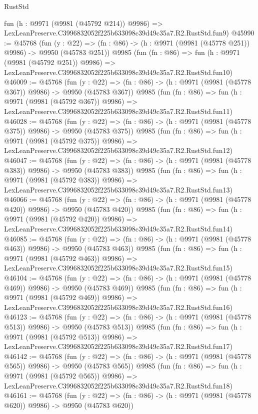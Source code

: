 \begin{lexlean}{RustStd}
\begin{coremodule}
    fun (h : @9971 (@9981 (@45792 @214)) @9986) =>
    LexLeanPreserve.C3996832052f225b633098c39d49c35a7.R2.RustStd.fun9)
@45990 := @45768
    (fun (y : @22) => (fn : @86) -> (h : @9971 (@9981 (@45778 @251)) @9986) -> @9950 (@45783 @251))
    @9985
    (fun (fn : @86) =>
    fun (h : @9971 (@9981 (@45792 @251)) @9986) =>
    LexLeanPreserve.C3996832052f225b633098c39d49c35a7.R2.RustStd.fun10)
@46009 := @45768
    (fun (y : @22) => (fn : @86) -> (h : @9971 (@9981 (@45778 @367)) @9986) -> @9950 (@45783 @367))
    @9985
    (fun (fn : @86) =>
    fun (h : @9971 (@9981 (@45792 @367)) @9986) =>
    LexLeanPreserve.C3996832052f225b633098c39d49c35a7.R2.RustStd.fun11)
@46028 := @45768
    (fun (y : @22) => (fn : @86) -> (h : @9971 (@9981 (@45778 @375)) @9986) -> @9950 (@45783 @375))
    @9985
    (fun (fn : @86) =>
    fun (h : @9971 (@9981 (@45792 @375)) @9986) =>
    LexLeanPreserve.C3996832052f225b633098c39d49c35a7.R2.RustStd.fun12)
@46047 := @45768
    (fun (y : @22) => (fn : @86) -> (h : @9971 (@9981 (@45778 @383)) @9986) -> @9950 (@45783 @383))
    @9985
    (fun (fn : @86) =>
    fun (h : @9971 (@9981 (@45792 @383)) @9986) =>
    LexLeanPreserve.C3996832052f225b633098c39d49c35a7.R2.RustStd.fun13)
@46066 := @45768
    (fun (y : @22) => (fn : @86) -> (h : @9971 (@9981 (@45778 @420)) @9986) -> @9950 (@45783 @420))
    @9985
    (fun (fn : @86) =>
    fun (h : @9971 (@9981 (@45792 @420)) @9986) =>
    LexLeanPreserve.C3996832052f225b633098c39d49c35a7.R2.RustStd.fun14)
@46085 := @45768
    (fun (y : @22) => (fn : @86) -> (h : @9971 (@9981 (@45778 @463)) @9986) -> @9950 (@45783 @463))
    @9985
    (fun (fn : @86) =>
    fun (h : @9971 (@9981 (@45792 @463)) @9986) =>
    LexLeanPreserve.C3996832052f225b633098c39d49c35a7.R2.RustStd.fun15)
@46104 := @45768
    (fun (y : @22) => (fn : @86) -> (h : @9971 (@9981 (@45778 @469)) @9986) -> @9950 (@45783 @469))
    @9985
    (fun (fn : @86) =>
    fun (h : @9971 (@9981 (@45792 @469)) @9986) =>
    LexLeanPreserve.C3996832052f225b633098c39d49c35a7.R2.RustStd.fun16)
@46123 := @45768
    (fun (y : @22) => (fn : @86) -> (h : @9971 (@9981 (@45778 @513)) @9986) -> @9950 (@45783 @513))
    @9985
    (fun (fn : @86) =>
    fun (h : @9971 (@9981 (@45792 @513)) @9986) =>
    LexLeanPreserve.C3996832052f225b633098c39d49c35a7.R2.RustStd.fun17)
@46142 := @45768
    (fun (y : @22) => (fn : @86) -> (h : @9971 (@9981 (@45778 @565)) @9986) -> @9950 (@45783 @565))
    @9985
    (fun (fn : @86) =>
    fun (h : @9971 (@9981 (@45792 @565)) @9986) =>
    LexLeanPreserve.C3996832052f225b633098c39d49c35a7.R2.RustStd.fun18)
@46161 := @45768
    (fun (y : @22) => (fn : @86) -> (h : @9971 (@9981 (@45778 @620)) @9986) -> @9950 (@45783 @620))

\end{coremodule}
\end{lexlean}
